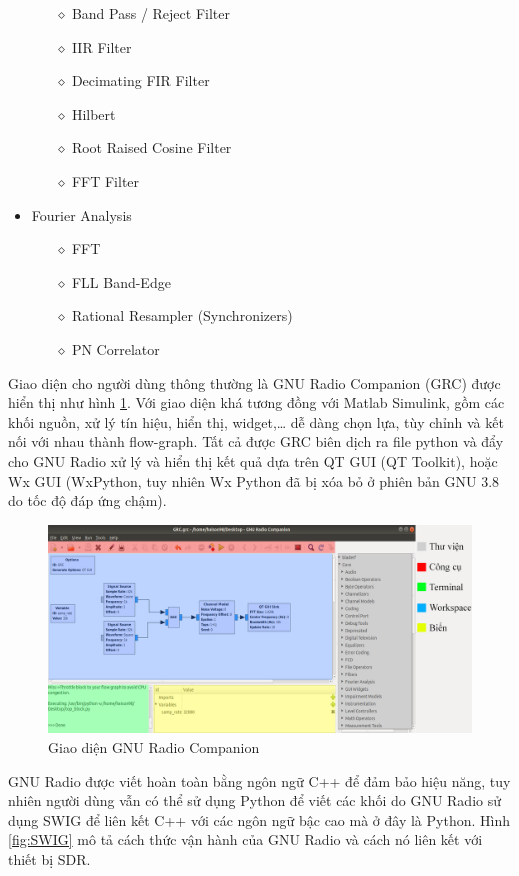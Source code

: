 \begin{itemize}
\begin{itemize}
		\item[$\diamond$] Band Pass / Reject Filter
		\item[$\diamond$] IIR Filter
		\item[$\diamond$] Decimating FIR Filter
		\item[$\diamond$] Hilbert
		\item[$\diamond$] Root Raised Cosine Filter
		\item[$\diamond$] FFT Filter
	\end{itemize}
\item Fourier Analysis 
	\begin{itemize}
		\item[$\diamond$] FFT
		\item[$\diamond$] FLL Band-Edge
		\item[$\diamond$] Rational Resampler (Synchronizers)
		\item[$\diamond$] PN Correlator
	\end{itemize}
\end{itemize}

Giao diện cho người dùng thông thường là GNU Radio Companion (GRC) được hiển thị như hình \ref{fig:GNURadio}. Với giao diện khá tương đồng với Matlab Simulink, gồm các khối nguồn, xử lý tín hiệu, hiển thị, widget,… dễ dàng chọn lựa, tùy chỉnh và kết nối với nhau thành flow-graph. Tất cả được GRC biên dịch ra file python và đẩy cho GNU Radio xử lý và hiển thị kết quả dựa trên QT GUI (QT Toolkit), hoặc Wx GUI (WxPython, tuy nhiên Wx Python đã bị xóa bỏ ở phiên bản GNU 3.8 do tốc độ đáp ứng chậm).

\begin{figure} [!h]
	\centering
	\includegraphics[width=1\linewidth]{figures/GNURadio1.png}
	\caption{Giao diện GNU Radio Companion}
	\label{fig:GNURadio}
\end{figure}

GNU Radio được viết hoàn toàn bằng ngôn ngữ C++ để đảm bảo hiệu năng, tuy nhiên người dùng vẫn có thể sử dụng Python để viết các khối do GNU Radio sử dụng SWIG để liên kết C++ với các ngôn ngữ bậc cao mà ở đây là Python. Hình \ref{fig:SWIG} mô tả cách thức vận hành của GNU Radio và cách nó liên kết với thiết bị SDR.

